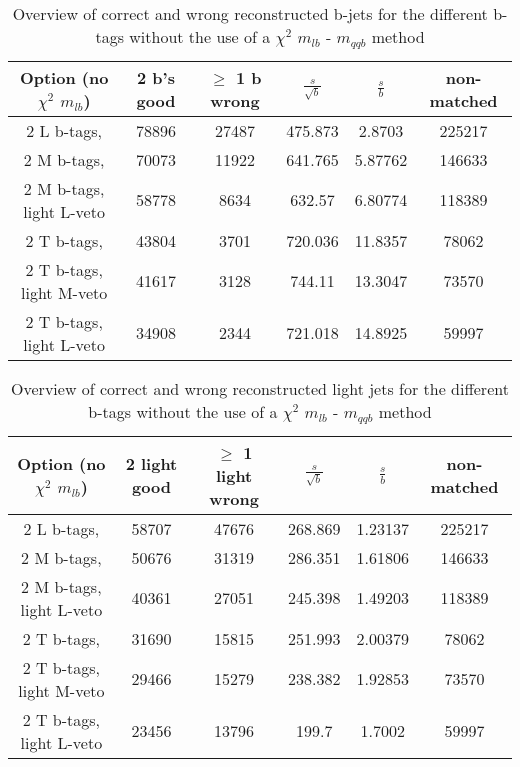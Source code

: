 \documentclass[a4paper,12pt]{report}
\begin{document}
 \begin{table}[!h] 
 \begin{tabular}{c|c|c|c|c|c} 
 \textbf{Option} (no $\chi^{2}$ $m_{lb}$) & 2 b's good      & $\geq$ 1 b wrong     & $\frac{s}{\sqrt{b}}$ & $\frac{s}{b}$ & non-matched \\ \hline 
2 L b-tags,                & 78896 & 27487 & 475.873 & 2.8703 & 225217 \\ 
2 M b-tags,              & 70073 & 11922 & 641.765 & 5.87762 & 146633 \\ 
2 M b-tags, light L-veto & 58778 & 8634 & 632.57 & 6.80774 & 118389 \\ 
2 T b-tags,              & 43804 & 3701 & 720.036 & 11.8357 & 78062 \\ 
2 T b-tags, light M-veto & 41617 & 3128 & 744.11 & 13.3047 & 73570 \\ 
2 T b-tags, light L-veto & 34908 & 2344 & 721.018 & 14.8925 & 59997 \\ 
 \end{tabular} 
 \caption{Overview of correct and wrong reconstructed b-jets for the different b-tags without the use of a $\chi^{2}$ $m_{lb}$ - $m_{qqb}$ method} 
 \end{table} 
 
 \begin{table}[!h] 
 \begin{tabular}{c|c|c|c|c|c} 
 \textbf{Option} (no $\chi^{2}$ $m_{lb}$) & 2 light good    & $\geq$ 1 light wrong & $\frac{s}{\sqrt{b}}$ & $\frac{s}{b}$ & non-matched \\ \hline 
2 L b-tags,                & 58707 & 47676 & 268.869 & 1.23137 & 225217 \\ 
2 M b-tags,              & 50676 & 31319 & 286.351 & 1.61806 & 146633 \\ 
2 M b-tags, light L-veto & 40361 & 27051 & 245.398 & 1.49203 & 118389 \\ 
2 T b-tags,              & 31690 & 15815 & 251.993 & 2.00379 & 78062 \\ 
2 T b-tags, light M-veto & 29466 & 15279 & 238.382 & 1.92853 & 73570 \\ 
2 T b-tags, light L-veto & 23456 & 13796 & 199.7 & 1.7002 & 59997 \\ 
 \end{tabular} 
 \caption{Overview of correct and wrong reconstructed light jets for the different b-tags without the use of a $\chi^{2}$ $m_{lb}$ - $m_{qqb}$ method} 
 \end{table} 
 
\end{document}
